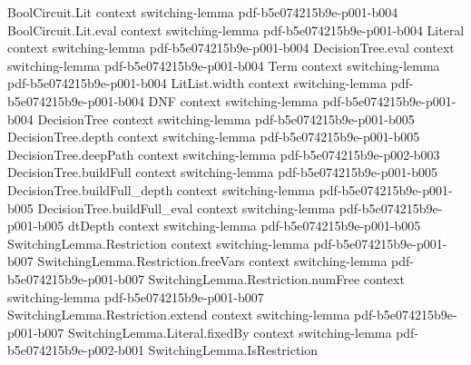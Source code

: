 \begin{lemma}
\label{SwitchingLemma.fiber_bound}
\leanok
{}
\proofstep
  {BoolCircuit.Lit}
  {context}
  {switching-lemma}
  {pdf-b5e074215b9e-p001-b004}
\proofstep
  {BoolCircuit.Lit.eval}
  {context}
  {switching-lemma}
  {pdf-b5e074215b9e-p001-b004}
\proofstep
  {Literal}
  {context}
  {switching-lemma}
  {pdf-b5e074215b9e-p001-b004}
\proofstep
  {DecisionTree.eval}
  {context}
  {switching-lemma}
  {pdf-b5e074215b9e-p001-b004}
\proofstep
  {Term}
  {context}
  {switching-lemma}
  {pdf-b5e074215b9e-p001-b004}
\proofstep
  {LitList.width}
  {context}
  {switching-lemma}
  {pdf-b5e074215b9e-p001-b004}
\proofstep
  {DNF}
  {context}
  {switching-lemma}
  {pdf-b5e074215b9e-p001-b004}
\proofstep
  {DecisionTree}
  {context}
  {switching-lemma}
  {pdf-b5e074215b9e-p001-b005}
\proofstep
  {DecisionTree.depth}
  {context}
  {switching-lemma}
  {pdf-b5e074215b9e-p001-b005}
\proofstep
  {DecisionTree.deepPath}
  {context}
  {switching-lemma}
  {pdf-b5e074215b9e-p002-b003}
\proofstep
  {DecisionTree.buildFull}
  {context}
  {switching-lemma}
  {pdf-b5e074215b9e-p001-b005}
\proofstep
  {DecisionTree.buildFull_depth}
  {context}
  {switching-lemma}
  {pdf-b5e074215b9e-p001-b005}
\proofstep
  {DecisionTree.buildFull_eval}
  {context}
  {switching-lemma}
  {pdf-b5e074215b9e-p001-b005}
\proofstep
  {dtDepth}
  {context}
  {switching-lemma}
  {pdf-b5e074215b9e-p001-b005}
\proofstep
  {SwitchingLemma.Restriction}
  {context}
  {switching-lemma}
  {pdf-b5e074215b9e-p001-b007}
\proofstep
  {SwitchingLemma.Restriction.freeVars}
  {context}
  {switching-lemma}
  {pdf-b5e074215b9e-p001-b007}
\proofstep
  {SwitchingLemma.Restriction.numFree}
  {context}
  {switching-lemma}
  {pdf-b5e074215b9e-p001-b007}
\proofstep
  {SwitchingLemma.Restriction.extend}
  {context}
  {switching-lemma}
  {pdf-b5e074215b9e-p001-b007}
\proofstep
  {SwitchingLemma.Literal.fixedBy}
  {context}
  {switching-lemma}
  {pdf-b5e074215b9e-p002-b001}
\proofstep
  {SwitchingLemma.IsRestriction}

\end{lemma}
